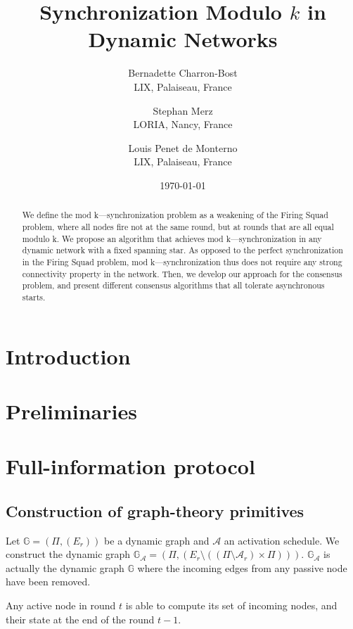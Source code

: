 \documentclass[11pt,letterpaper]{article}
\title{Synchronization Modulo $k$ in Dynamic Networks}
\author{
	Bernadette Charron-Bost \\
	LIX, Palaiseau, France
\and
	Stephan Merz \\
	LORIA, Nancy, France
\and
	Louis Penet de Monterno \\
	LIX, Palaiseau, France
}
\date{\today}
\begin{document}
\maketitle
\tableofcontents

\begin{abstract}
	We define the mod k—synchronization problem as a weakening of the Firing Squad problem,
	where all nodes fire not at the same round, but at rounds that are all equal modulo k.
	We propose an algorithm that achieves mod k—synchronization  in any dynamic network
	with a fixed spanning star. As opposed to the perfect synchronization in
	the Firing Squad problem, mod k—synchronization thus does not require
	any strong connectivity property in the network. 
	Then, we develop our approach for the consensus problem,
	and present different consensus algorithms that all tolerate asynchronous starts.
\end{abstract}

\section{Introduction}

\section{Preliminaries}\label{sec:model}

\section{Full-information protocol}

\subsection{Construction of graph-theory primitives}

Let $\mathds{G} = (\Pi, (E_r))$ be a dynamic graph and $\mathcal{A}$ an activation schedule.
We construct the dynamic graph $\mathds{G}_\mathcal{A} = (\Pi, (E_r \setminus ((\Pi \setminus \mathcal{A}_r) \times \Pi)))$.
$\mathds{G}_\mathcal{A}$ is actually the dynamic graph $\mathds{G}$ where the incoming edges from any passive node have been removed.

Any active node in round $t$ is able to compute its set of incoming nodes, and their state at the end of the round $t-1$.
\end{document}
